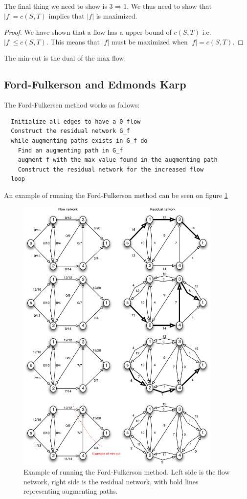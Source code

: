 \documentclass[10pt]{article}
\begin{document}
The final thing we need to show is $3 \Rightarrow 1$. We thus need to show that $|f| = c(S,T)$ implies that $|f|$ is maximized. 

\begin{proof}
  We have shown that a flow has a upper bound of $c(S,T)$ i.e. $|f| \leq c(S,T)$. This means that $|f|$ must be maximized when $|f| = c(S,T)$.  
\end{proof}

The min-cut is the dual of the max flow.
                                                          
\subsection{Ford-Fulkerson and Edmonds Karp} %
\label{sub:ford_fulkerson_and_edmonds_karp}
The Ford-Fulkersen method works as follows:
\begin{verbatim}
  Initialize all edges to have a 0 flow
  Construct the residual network G_f   
  while augmenting paths exists in G_f do
    Find an augmenting path in G_f
    augment f with the max value found in the augmenting path 
    Construct the residual network for the increased flow
  loop 
\end{verbatim}

An example of running the Ford-Fulkerson method can be seen on figure \ref{fig1}

\begin{figure}[ht]
\centering
\includegraphics[width=0.9\textwidth]{figures/fig1.pdf}
\caption{Example of running the Ford-Fulkerson method. Left side is the flow network, right side is the residual network, with bold lines representing augmenting paths.}
\label{fig1}
\end{figure}
\end{document}
